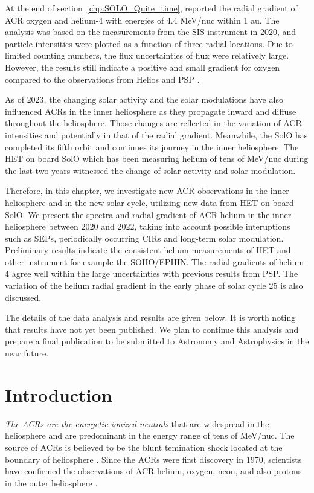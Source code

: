 At the end of section~\ref{chp:SOLO_Quite_time}, \citet{Mason-2021-SolOQuietTime} reported the radial gradient of \ac{ACR} oxygen and helium-4 with energies of 4.4 MeV/nuc within 1 au. The analysis was based on the measurements from the \ac{SIS} instrument in 2020, and particle intensities were plotted as a function of three radial locations. Due to limited counting numbers, the flux uncertainties of flux were relatively large. However, the results still indicate a positive and small gradient for oxygen compared to the observations from Helios and \ac{PSP} \citep{Marquardt2018AA,Rankin2021ApJ}.

As of 2023, the changing solar activity and the solar modulations have also influenced \acp{ACR} in the inner heliosphere as they propagate inward and diffuse throughout the heliosphere. Those changes are reflected in the variation of \ac{ACR} intensities and potentially in that of the radial gradient.
Meanwhile, the \ac{SolO} has completed its fifth orbit and continues its journey in the inner heliosphere. The \ac{HET} on board \ac{SolO} which has been measuring helium of tens of MeV/nuc during the last two years witnessed the change of solar activity and solar modulation.

Therefore, in this chapter, we investigate new \ac{ACR} observations in the inner heliosphere and in the new solar cycle, utilizing new data from \ac{HET} on board \ac{SolO}. We present the spectra and radial gradient of \ac{ACR} helium in the inner heliosphere between 2020 and 2022, taking into account possible interuptions such as \acp{SEP}, periodically occurring \acp{CIR} and long-term solar modulation.
Preliminary results indicate the consistent helium measurements of \ac{HET} and other instrument for example the \ac{SOHO}/\ac{EPHIN}. The radial gradients of helium-4 agree well within the large uncertainties with previous results from \ac{PSP}. The variation of the helium radial gradient in the early phase of solar cycle 25 is also discussed.

The details of the data analysis and results are given below. It is worth noting that results have not yet been published. We plan to continue this analysis and prepare a final publication to be submitted to Astronomy and Astrophysics in the near future.


\section{Introduction}

\emph{The \acp{ACR} are the energetic ionized neutrals} that are widespread in the heliosphere and are predominant in the energy range of tens of MeV/nuc. The source of \acp{ACR} is believed to be the blunt temination shock located at the boundary of heliosphere \citep{McComas2006GeoRL}. Since the \acp{ACR} were first discovery in 1970, scientists have confirmed the observations of \ac{ACR} helium, oxygen, neon, and also protons in the outer heliosphere \citep{Garcia1973ICRC,Hoverstadt1973PhRvL,McDonald1974ApJ,Potgieter2013LRSP}.

